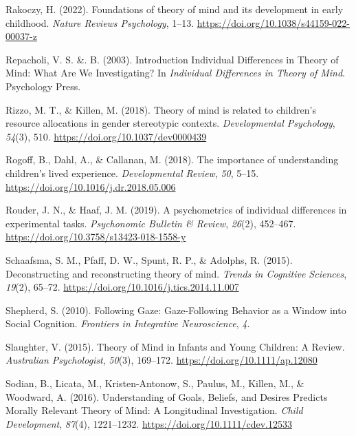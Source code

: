 \documentclass[
  man,floatsintext]{apa6}
\newlength{\cslhangindent}
\newlength{\cslentryspacingunit} %
\newenvironment{CSLReferences}[2] %
 {%
  \setlength{\parindent}{0pt}
  \ifodd #1
  \let\oldpar\par
  \def\par{\hangindent=\cslhangindent\oldpar}
  \fi
  \setlength{\parskip}{#2\cslentryspacingunit}
 }%
 {}
\begin{document}
\begin{CSLReferences}{1}{0}
\leavevmode{}%
Rakoczy, H. (2022). Foundations of theory of mind and its development in early childhood. \emph{Nature Reviews Psychology}, 1--13. \url{https://doi.org/10.1038/s44159-022-00037-z}

\leavevmode{}%
Repacholi, V. S. \&. B. (2003). Introduction {Individual Differences} in {Theory} of {Mind}: {What Are We Investigating}? In \emph{Individual {Differences} in {Theory} of {Mind}}. {Psychology Press}.

\leavevmode{}%
Rizzo, M. T., \& Killen, M. (2018). Theory of mind is related to children's resource allocations in gender stereotypic contexts. \emph{Developmental Psychology}, \emph{54}(3), 510. \url{https://doi.org/10.1037/dev0000439}

\leavevmode{}%
Rogoff, B., Dahl, A., \& Callanan, M. (2018). The importance of understanding children's lived experience. \emph{Developmental Review}, \emph{50}, 5--15. \url{https://doi.org/10.1016/j.dr.2018.05.006}

\leavevmode{}%
Rouder, J. N., \& Haaf, J. M. (2019). A psychometrics of individual differences in experimental tasks. \emph{Psychonomic Bulletin \& Review}, \emph{26}(2), 452--467. \url{https://doi.org/10.3758/s13423-018-1558-y}

\leavevmode{}%
Schaafsma, S. M., Pfaff, D. W., Spunt, R. P., \& Adolphs, R. (2015). Deconstructing and reconstructing theory of mind. \emph{Trends in Cognitive Sciences}, \emph{19}(2), 65--72. \url{https://doi.org/10.1016/j.tics.2014.11.007}

\leavevmode{}%
Shepherd, S. (2010). Following {Gaze}: {Gaze-Following Behavior} as a {Window} into {Social Cognition}. \emph{Frontiers in Integrative Neuroscience}, \emph{4}.

\leavevmode{}%
Slaughter, V. (2015). Theory of {Mind} in {Infants} and {Young Children}: {A Review}. \emph{Australian Psychologist}, \emph{50}(3), 169--172. \url{https://doi.org/10.1111/ap.12080}

\leavevmode{}%
Sodian, B., Licata, M., Kristen-Antonow, S., Paulus, M., Killen, M., \& Woodward, A. (2016). Understanding of {Goals}, {Beliefs}, and {Desires Predicts Morally Relevant Theory} of {Mind}: {A Longitudinal Investigation}. \emph{Child Development}, \emph{87}(4), 1221--1232. \url{https://doi.org/10.1111/cdev.12533}


\end{CSLReferences}
\end{document}
